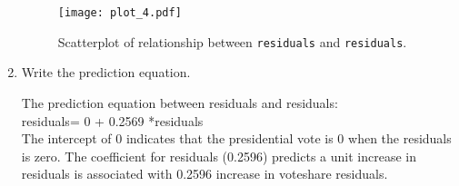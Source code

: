 \documentclass[12pt,letterpaper]{article}
\begin{document}
\begin{enumerate}
\begin{figure}[h!]
			\caption{\footnotesize Scatterplot of relationship between \texttt{residuals} and \texttt{residuals}.}
			\label{fig:plot_4}
			\texttt{[image: plot\_4.pdf]}
		\end{figure}
		\item Write the prediction equation.
		
		\vspace{.15cm}
		 
		\vspace{.15cm}
		\noindent The prediction equation between residuals and residuals:\\
		\vspace{.25cm}
		residuals= 0 + 0.2569 *residuals\\
		\noindent The intercept of 0 indicates that the presidential vote is 0 when the residuals is zero. 
		The coefficient for residuals (0.2596) predicts a unit increase in residuals is associated with 0.2596 increase in voteshare	residuals.
	\end{enumerate}
	
\vspace{.5cm}
\end{document}
